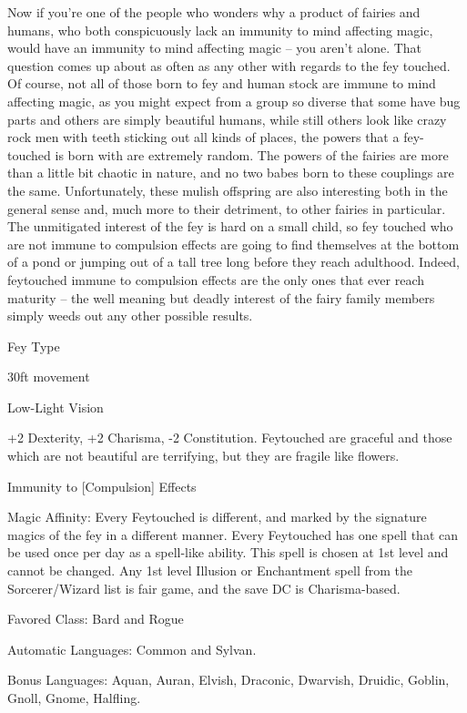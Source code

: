 
Now if you're one of the people who wonders why a product of fairies and humans, who both conspicuously lack an immunity to mind affecting magic, would have an immunity to mind affecting magic -- you aren't alone. That question comes up about as often as any other with regards to the fey touched. Of course, not all of those born to fey and human stock are immune to mind affecting magic, as you might expect from a group so diverse that some have bug parts and others are simply beautiful humans, while still others look like crazy rock men with teeth sticking out all kinds of places, the powers that a fey-touched is born with are extremely random. The powers of the fairies are more than a little bit chaotic in nature, and no two babes born to these couplings are the same. Unfortunately, these mulish offspring are also interesting both in the general sense and, much more to their detriment, to other fairies in particular. The unmitigated interest of the fey is hard on a small child, so fey touched who are not immune to compulsion effects are going to find themselves at the bottom of a pond or jumping out of a tall tree long before they reach adulthood. Indeed, feytouched immune to compulsion effects are the only ones that ever reach maturity -- the well meaning but deadly interest of the fairy family members simply weeds out any other possible results.

\begin{itemize*}
\item Fey Type
\item 30ft movement
\item Low-Light Vision
\item +2 Dexterity, +2 Charisma, -2 Constitution. Feytouched are graceful and those which are not beautiful are terrifying, but they are fragile like flowers.
\item Immunity to [Compulsion] Effects
\item Magic Affinity: Every Feytouched is different, and marked by the signature magics of the fey in a different manner. Every Feytouched has one spell that can be used once per day as a spell-like ability. This spell is chosen at 1st level and cannot be changed. Any 1st level Illusion or Enchantment spell from the Sorcerer/Wizard list is fair game, and the save DC is Charisma-based.
\item Favored Class: Bard and Rogue
\item Automatic Languages: Common and Sylvan.
\item Bonus Languages: Aquan, Auran, Elvish, Draconic, Dwarvish, Druidic, Goblin, Gnoll, Gnome, Halfling.
\end{itemize*}
